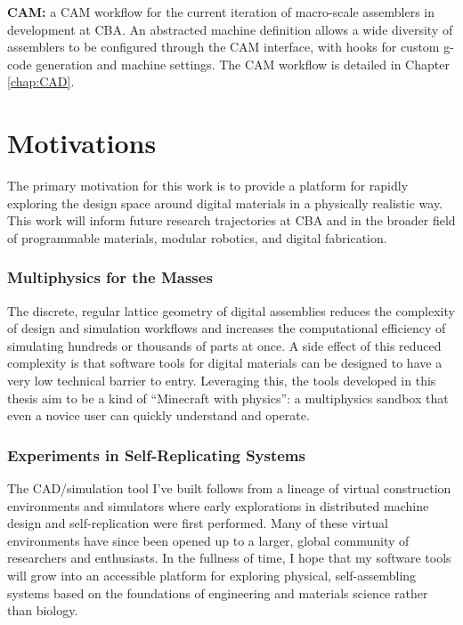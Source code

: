 {\textbf{CAM:} a CAM workflow for the current iteration of macro-scale assemblers in development at CBA.  An abstracted machine definition allows a wide diversity of assemblers to be configured through the CAM interface, with hooks for custom g-code generation and machine settings.  The CAM workflow is detailed in Chapter \ref{chap:CAD}.

\section{Motivations}
 
The primary motivation for this work is to provide a platform for rapidly exploring the design space around digital materials in a physically realistic way.  This work will inform future research trajectories at CBA and in the broader field of programmable materials, modular robotics, and digital fabrication.   

\subsubsection{Multiphysics for the Masses}

The discrete, regular lattice geometry of digital assemblies reduces the complexity of design and simulation workflows and increases the computational efficiency of simulating hundreds or thousands of parts at once.   A side effect of this reduced complexity is that software tools for digital materials can be designed to have a very low technical barrier to entry.  Leveraging this, the tools developed in this thesis aim to be a kind of ``Minecraft with physics'': a multiphysics sandbox that even a novice user can quickly understand and operate.

\subsubsection{Experiments in Self-Replicating Systems}

The CAD/simulation tool I've built follows from a lineage of virtual construction environments and simulators where early explorations in distributed machine design and self-replication were first performed.  Many of these virtual environments have since been opened up to a larger, global community of researchers and enthusiasts.  In the fullness of time, I hope that my software tools will grow into an accessible platform for exploring physical, self-assembling systems based on the foundations of engineering and materials science rather than biology.   


}
